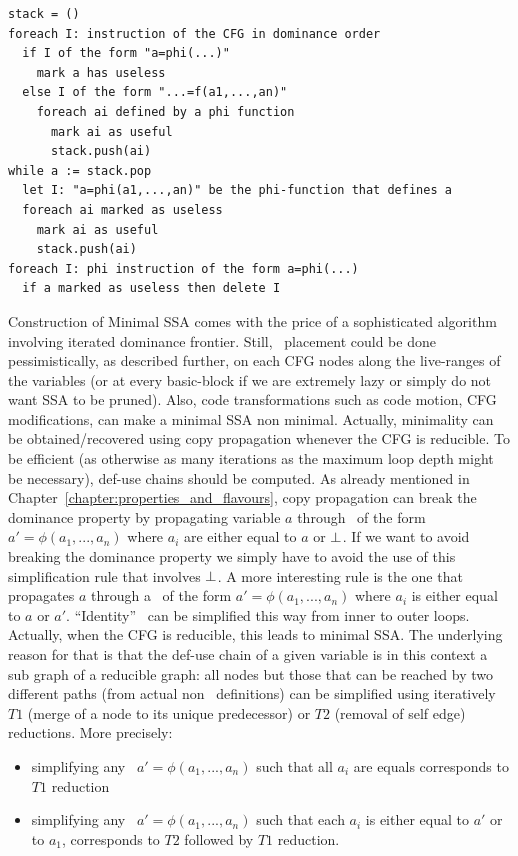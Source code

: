 \begin{algorithm}
\begin{verbatim}
stack = ()
foreach I: instruction of the CFG in dominance order
  if I of the form "a=phi(...)"
    mark a has useless
  else I of the form "...=f(a1,...,an)"
    foreach ai defined by a phi function
      mark ai as useful
      stack.push(ai)
while a := stack.pop
  let I: "a=phi(a1,...,an)" be the phi-function that defines a
  foreach ai marked as useless
    mark ai as useful
    stack.push(ai)
foreach I: phi instruction of the form a=phi(...)
  if a marked as useless then delete I  
\end{verbatim}
\label{alg:classical_construction_algorithm:pruning}
\end{algorithm}
Construction of Minimal SSA comes with the price of a sophisticated algorithm involving iterated dominance frontier. 
Still, \phiops\ placement could be done pessimistically, as described further, on each CFG nodes along the live-ranges of the variables (or at every basic-block if we are extremely lazy or simply do not want SSA to be pruned). 
Also, code transformations such as code motion, CFG modifications, can make a minimal SSA non minimal.
Actually, minimality can be obtained/recovered using copy propagation whenever the CFG is reducible. 
To be efficient (as otherwise as many iterations as the maximum loop depth might be necessary), def-use chains should be computed. 
As already mentioned in Chapter~\ref{chapter:properties_and_flavours}, copy propagation can break the dominance property by propagating variable $a$ through \phiops\ of the form $a'=\phi(a_1,...,a_n)$ where $a_i$ are either equal to $a$ or $\perp$. 
If we want to avoid breaking the dominance property we simply have to avoid the use of this simplification rule that involves $\perp$. 
A more interesting rule is the one that propagates $a$ through a \phiop\ of the form $a'=\phi(a_1,...,a_n)$ where $a_i$ is either equal to $a$ or $a'$. 
``Identity'' \phiops\ can be simplified this way from inner to outer loops. 
Actually, when the CFG is reducible, this leads to minimal SSA. 
The underlying reason for that is that the def-use chain of a given variable is in this context a sub graph of a reducible graph: 
all nodes but those that can be reached by two different paths (from actual non \phiops\ definitions) can be simplified using iteratively $T1$ (merge of a node to its unique predecessor) or $T2$ (removal of self edge) reductions.
More precisely:
\begin{itemize}
\item simplifying any \phiop\ $a'=\phi(a_1,...,a_n)$ such that all $a_i$ are equals corresponds to $T1$ reduction
\item simplifying any \phiop\ $a'=\phi(a_1,...,a_n)$ such that each $a_i$ is either equal to $a'$ or to $a_1$, corresponds to $T2$ followed by $T1$ reduction.
\end{itemize}
